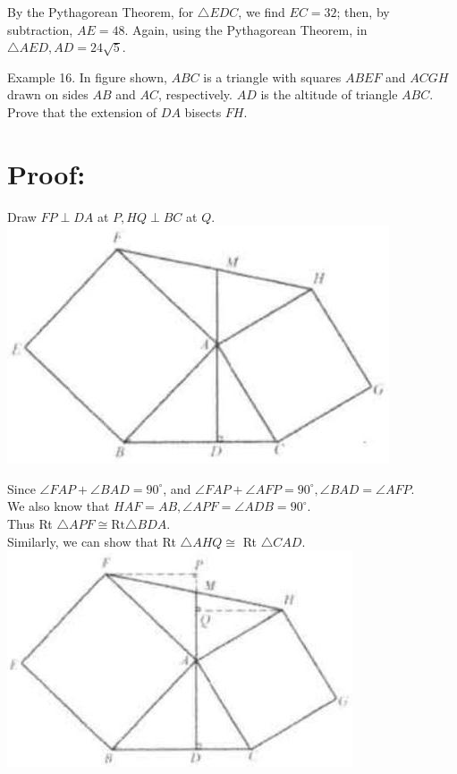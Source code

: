 \documentclass[10pt]{article}
\begin{document}
By the Pythagorean Theorem, for \(\triangle E D C\), we find \(E C=32\); then, by subtraction, \(A E=48\). Again, using the Pythagorean Theorem, in \(\triangle A E D, A D=24 \sqrt{5}\).

Example 16. In figure shown, \(A B C\) is a triangle with squares \(A B E F\) and \(A C G H\) drawn on sides \(A B\) and \(A C\), respectively. \(A D\) is the altitude of triangle \(A B C\). Prove that the extension of \(D A\) bisects \(F H\).

\section*{Proof:}
Draw \(F P \perp D A\) at \(P, H Q \perp B C\) at \(Q\).\\
\includegraphics[max width=\textwidth, center]{2025_04_17_97bc1f7e44d93c271a88g-084}

Since \(\angle F A P+\angle B A D=90^{\circ}\), and \(\angle F A P+\angle A F P=90^{\circ}, \angle B A D=\angle A F P\).\\
We also know that \(H A F=A B, \angle A P F=\angle A D B=90^{\circ}\).\\
Thus Rt \(\triangle A P F \cong \mathrm{Rt} \triangle B D A\).\\
Similarly, we can show that Rt \(\triangle A H Q \cong\) Rt \(\triangle C A D\).\\
\includegraphics[max width=\textwidth, center]{2025_04_17_97bc1f7e44d93c271a88g-084(2)}
\end{document}

